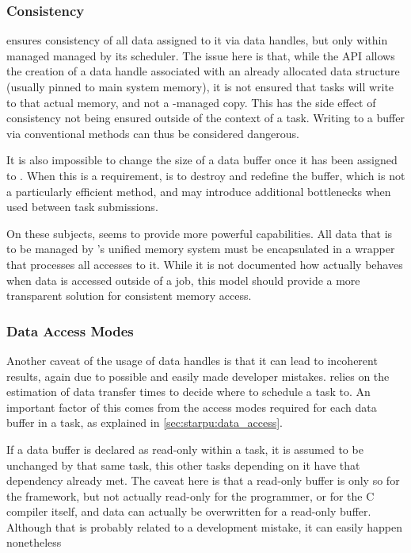 \documentclass[main.tex]{subfiles}
\begin{document}
\subsubsection{Consistency} \label{sec:comparison:consistency}

\starpu ensures consistency of all data assigned to it via data handles, but only within managed managed by its scheduler. The issue here is that, while the API allows the creation of a data handle associated with an already allocated data structure (usually pinned to main system memory), it is not ensured that tasks will write to that actual memory, and not a \starpu-managed copy. This has the side effect of consistency not being ensured outside of the context of a task. Writing to a buffer via conventional methods can thus be considered dangerous.

It is also impossible to change the size of a data buffer once it has been assigned to \starpu. When this is a requirement, is to destroy and redefine the buffer, which is not a particularly efficient method, and may introduce additional bottlenecks when used between task submissions.

On these subjects, \gama seems to provide more powerful capabilities. All data that is to be managed by \gama's unified memory system must be encapsulated in a wrapper that processes all accesses to it. While it is not documented how \gama actually behaves when data is accessed outside of a job, this model should provide a more transparent solution for consistent memory access.


\subsubsection{Data Access Modes}

Another caveat of the usage of data handles is that it can lead to incoherent results, again due to possible and easily made developer mistakes. \starpu relies on the estimation of data transfer times to decide where to schedule a task to. An important factor of this comes from the access modes required for each data buffer in a task, as explained in \cref{sec:starpu:data_access}.

If a data buffer is declared as read-only within a task, it is assumed to be unchanged by that same task, this other tasks depending on it have that dependency already met.
The caveat here is that a read-only buffer is only so for the framework, but not actually read-only for the programmer, or for the C compiler itself, and data can actually be overwritten for a read-only buffer. Although that is probably related to a development mistake, it can easily happen nonetheless
\end{document}
